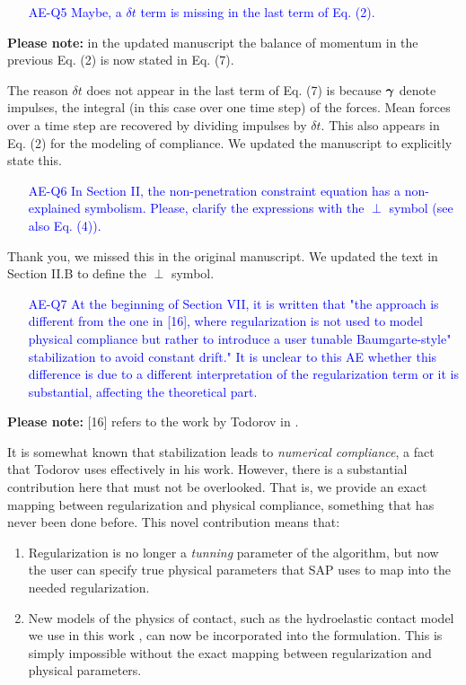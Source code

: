 \textcolor{blue}{\begin{itemize}
\item[AE-Q5] Maybe, a $\delta t$ term is missing in the last term of Eq. (2).
\end{itemize}} 

\textbf{Please note:} in the updated manuscript the balance of momentum in the
previous Eq. (2) is now stated in Eq. (7).

The reason $\delta t$ does not appear in the last term of Eq. (7) is because
${\bm\gamma}$ denote impulses, the integral (in this case over one time step) of the
forces. Mean forces over a time step are recovered by dividing impulses by $\delta
t$. This also appears in Eq. (2) for the modeling of compliance. We updated the
manuscript to explicitly state this.

\textcolor{blue}{\begin{itemize}
\item[AE-Q6] In Section II, the non-penetration constraint equation has a non-explained
symbolism. Please, clarify the expressions with the $\perp$ symbol (see also Eq.
(4)).\end{itemize}}

Thank you, we missed this in the original manuscript. We updated the text in
Section II.B to define the $\perp$ symbol.
    
\textcolor{blue}{\begin{itemize}
\item[AE-Q7] At the beginning of Section VII, it is written that "the approach is
different from the one in [16], where regularization is not used to model
physical compliance but rather to introduce a user tunable Baumgarte-style"
stabilization to avoid constant drift." It is unclear to this AE whether this
difference is due to a different interpretation of the regularization term or it
is substantial, affecting the theoretical part.\end{itemize}} 

\textbf{Please note:} [16] refers to the work by Todorov in
\cite{bib:todorov2014}.

It is somewhat known that stabilization leads to \emph{numerical compliance}, a
fact that Todorov uses effectively in his work. However, there is a substantial
contribution here that must not be overlooked. That is, we provide an exact
mapping between regularization and physical compliance, something that has never
been done before. This novel contribution means that:
\begin{enumerate}
    \item Regularization is no longer a \emph{tunning} parameter of the
    algorithm, but now the user can specify true physical parameters that SAP
    uses to map into the needed regularization.
    \item New models of the physics of contact, such as the hydroelastic contact
    model we use in this work
    \cite{bib:elandt2019pressure,bib:masterjohn2021discrete}, can now be
    incorporated into the formulation. This is simply impossible without the
    exact mapping between regularization and physical parameters.
\end{enumerate}


